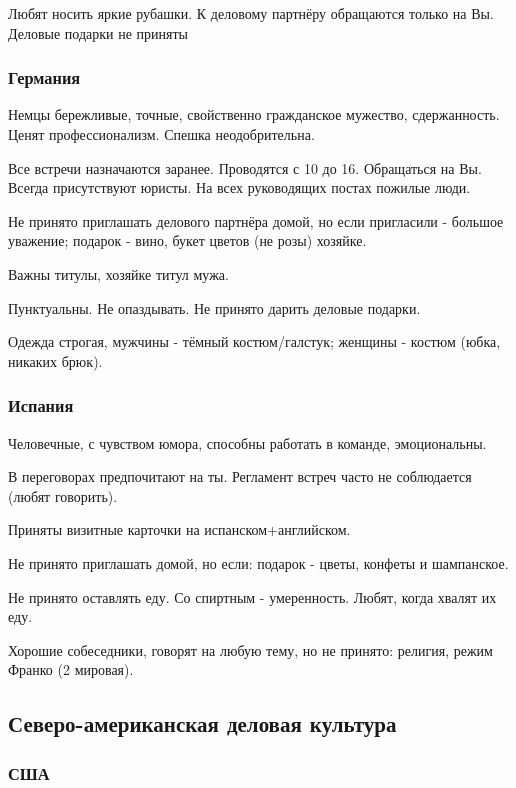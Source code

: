 \documentclass[a4paper,14pt]{extarticle}
\begin{document}
Любят носить яркие рубашки. К деловому партнёру обращаются только
на Вы. Деловые подарки не приняты

\subsubsection{Германия}

Немцы бережливые, точные, свойственно гражданское мужество, сдержанность. Ценят профессионализм. Спешка неодобрительна.

Все встречи назначаются заранее. Проводятся с 10 до 16. Обращаться на Вы. Всегда присутствуют юристы. На всех руководящих постах пожилые люди.

Не принято приглашать делового партнёра домой, но если пригласили - большое уважение; подарок - вино, букет цветов (не розы) хозяйке.

Важны титулы, хозяйке титул мужа.

Пунктуальны. Не опаздывать. Не принято дарить деловые подарки.

Одежда строгая, мужчины - тёмный костюм/галстук; женщины - костюм (юбка, никаких брюк).

\subsubsection{Испания}

Человечные, с чувством юмора, способны работать в команде, эмоциональны.

В переговорах предпочитают на ты. Регламент встреч часто не соблюдается (любят говорить).

Приняты визитные карточки на испанском+английском.

Не принято приглашать домой, но если: подарок - цветы, конфеты и шампанское.

Не принято оставлять еду. Со спиртным - умеренность. Любят, когда хвалят их еду.

Хорошие собеседники, говорят на любую тему, но не принято: религия, режим Франко (2 мировая).

\subsection{Северо-американская деловая культура}

\subsubsection{США}
\end{document}
